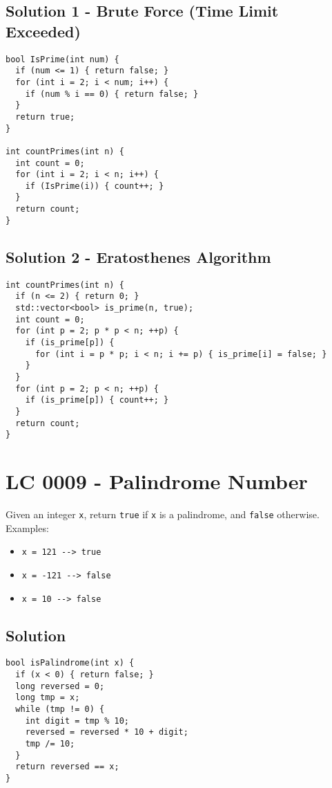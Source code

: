 \subsection*{Solution 1 - Brute Force (Time Limit Exceeded)}
\begin{lstlisting}
bool IsPrime(int num) {
  if (num <= 1) { return false; }
  for (int i = 2; i < num; i++) {
    if (num % i == 0) { return false; }
  }
  return true;
}

int countPrimes(int n) {
  int count = 0;
  for (int i = 2; i < n; i++) {
    if (IsPrime(i)) { count++; }
  }
  return count;
}
\end{lstlisting}

\subsection*{Solution 2 - Eratosthenes Algorithm}
\begin{lstlisting}
int countPrimes(int n) {
  if (n <= 2) { return 0; }
  std::vector<bool> is_prime(n, true);
  int count = 0;
  for (int p = 2; p * p < n; ++p) {
    if (is_prime[p]) {
      for (int i = p * p; i < n; i += p) { is_prime[i] = false; }
    }
  }
  for (int p = 2; p < n; ++p) {
    if (is_prime[p]) { count++; }
  }
  return count;
}
\end{lstlisting}

\section{LC 0009 - Palindrome Number}
Given an integer {\colorbox{CodeBackground}{\lstinline|x|}}, return {\colorbox{CodeBackground}{\lstinline|true|}} if {\colorbox{CodeBackground}{\lstinline|x|}} is a palindrome, and {\colorbox{CodeBackground}{\lstinline|false|}} otherwise.\\

Examples:
\begin{itemize}
\item {\colorbox{CodeBackground}{\lstinline|x = 121 --> true|}}
\item {\colorbox{CodeBackground}{\lstinline|x = -121 --> false|}}
\item {\colorbox{CodeBackground}{\lstinline|x = 10 --> false|}}
\end{itemize}

\subsection*{Solution}
\begin{lstlisting}
bool isPalindrome(int x) {
  if (x < 0) { return false; }
  long reversed = 0;
  long tmp = x;
  while (tmp != 0) {
    int digit = tmp % 10;
    reversed = reversed * 10 + digit;
    tmp /= 10;
  }
  return reversed == x;
}
\end{lstlisting}

